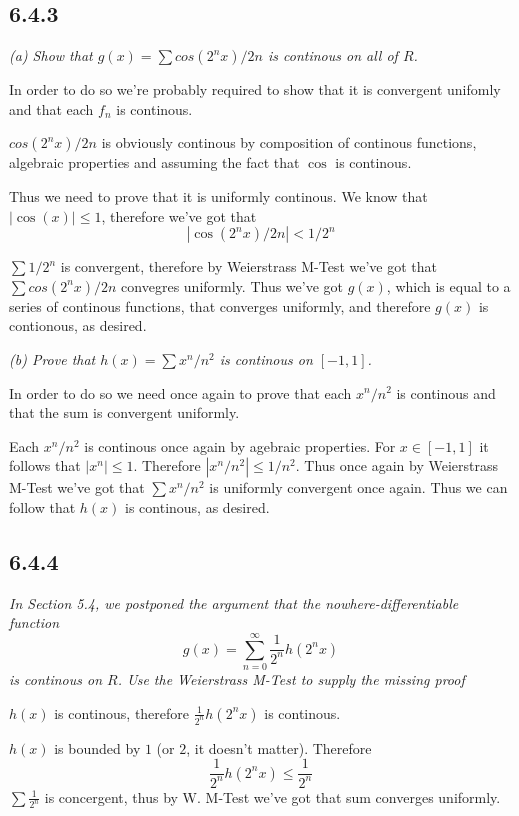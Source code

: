 \documentclass[11pt,oneside,titlepage]{book}
\begin{document}
\subsection*{6.4.3}

\textit{(a) Show that $g(x) = \sum cos(2^nx)/2n$ is continous on all of $R$.}

In order to do so we're probably required to show that it is
convergent unifomly and that each $f_n$ is continous.

$cos(2^nx)/2n$ is obviously continous by composition of continous  functions,
algebraic properties and assuming the fact that $\cos$ is continous.

Thus we need to prove that it is uniformly continous. 
We know  that $|\cos(x)| \leq 1$, therefore  we've got that
$$|\cos(2^nx)/2n| < 1/2^n$$

$\sum 1/2^n$ is convergent, therefore by Weierstrass M-Test we've got that
$\sum cos(2^nx)/2n$  convegres uniformly. Thus we've got $g(x)$,
which is equal to a series of continous functions, that converges uniformly,
and therefore $g(x)$ is contionous, as desired.

\textit{(b) Prove that $h(x) = \sum x^n/n^2$ is continous on $[-1, 1]$.}

In order to do so we need once again to prove that each $x^n/n^2$ is continous
and that the sum is convergent uniformly.

Each $x^n/n^2$ is continous once again by agebraic properties. For
$x \in [-1, 1]$ it follows that $|x^n| \leq 1 $. Therefore
$|x^n/n^2| \leq 1/n^2$. Thus once again by Weierstrass M-Test we've got that
$\sum x^n/n^2$ is uniformly convergent once again. Thus we can follow that
$h(x)$ is continous, as desired.

\subsection*{6.4.4}
\textit{In Section 5.4, we postponed the argument that the
  nowhere-differentiable function}
$$g(x) = \sum_{n = 0}^{\infty}{\frac{1}{2^n}h(2^nx)}$$
\textit{is continous on $R$. Use the Weierstrass M-Test to supply the missing
  proof}

$h(x)$ is continous, therefore $\frac{1}{2^n}h(2^nx)$ is continous.

$h(x)$ is bounded by $1$ (or $2$, it doesn't matter). Therefore
$$\frac{1}{2^n}h(2^nx) \leq \frac{1}{2^n}$$
$\sum \frac{1}{2^n}$ is concergent, thus by W. M-Test we've got that sum
converges uniformly.
\end{document}
